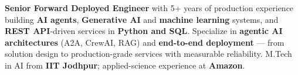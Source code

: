 \documentclass[letter,10pt]{article}
\begin{document}

\textbf{Senior Forward Deployed Engineer} with 5+ years of production experience building \textbf{AI agents}, \textbf{Generative AI} and \textbf{machine learning} systems, and \textbf{REST API}-driven services in \textbf{Python and SQL}.
Specialize in \textbf{agentic AI architectures} (A2A, CrewAI, RAG) and \textbf{end-to-end deployment} — from solution design to production-grade services with measurable reliability.
M.Tech in AI from \textbf{IIT Jodhpur}; applied-science experience at \textbf{Amazon}.
\end{document}
